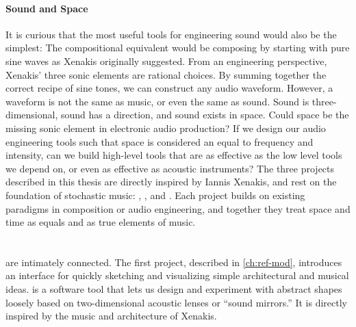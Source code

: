 \paragraph{Sound and Space}
It is curious that the most useful tools for engineering sound would
also be the simplest: The compositional equivalent would be composing
by starting with pure sine waves as Xenakis originally suggested.
From an engineering perspective, Xenakis' three sonic elements are
rational choices. By summing together the correct recipe of sine
tones, we can construct any audio waveform. However, a waveform is not
the same as music, or even the same as sound. Sound is
three-dimensional, sound has a direction, and sound exists in
space. Could space be the missing sonic element in electronic audio
production? If we design our audio engineering tools such that space
is considered an equal to frequency and intensity, can we build
high-level tools that are as effective as the low level tools we depend
on, or even as effective as acoustic instruments? The three projects
described in this thesis are directly inspired by Iannis Xenakis, and rest on
the foundation of stochastic music: , \polytempic, and
\thesis. Each project builds on existing paradigms in composition or
audio engineering, and together they treat space and time as equals
and as true elements of music.

\section{}
\label{sec:refmod-intro}
 are intimately connected. The first
project, described in \autoref{ch:ref-mod}, introduces an interface
for quickly sketching and visualizing simple architectural and musical
ideas.  is a software tool that lets us design and experiment
with abstract shapes loosely based on two-dimensional acoustic lenses
or ``sound mirrors.'' It is directly inspired by the music and
architecture of Xenakis.

